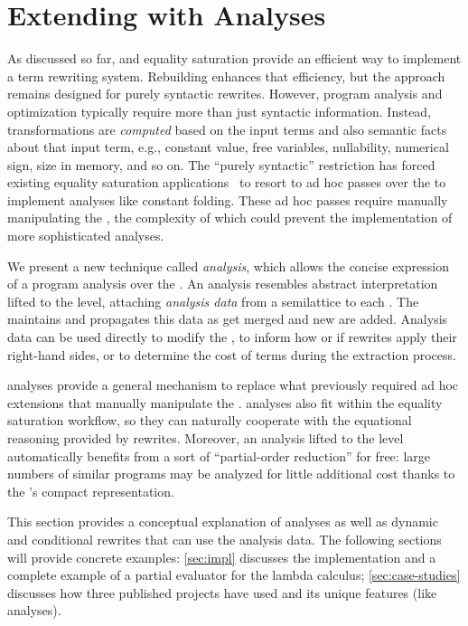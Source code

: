 \chapter{Extending \Egraphs with \Eclass Analyses}
\label{sec:extensions}

As discussed so far, \egraphs and equality saturation provide an efficient way
  to implement a term rewriting system.
Rebuilding enhances that efficiency, but the approach remains designed for
  purely syntactic rewrites.
However, program analysis and optimization typically require more than just
  syntactic information.
Instead, transformations are \emph{computed} based on the input terms and also semantic facts
  about that input term, e.g., constant value, free variables, nullability,
  numerical sign, size in memory, and so on.
The ``purely syntactic'' restriction has forced existing equality saturation
  applications~\cite{eqsat, eqsat-llvm, herbie} to
  resort to ad hoc passes over the \egraph
  to implement analyses like constant folding.
These ad hoc passes require manually manipulating the \egraph,
  the complexity of which could prevent the implementation of more sophisticated
  analyses.

We present a new technique called \textit{\eclass analysis},
  which allows the concise
  expression of a program analysis over the \egraph.
An \eclass analysis resembles abstract interpretation
  lifted to the \egraph level,
  attaching \textit{analysis data} from a semilattice to each \eclass.
The \egraph maintains and propagates this data as
  \eclasses get merged and new \enodes are added.
Analysis data can be used directly to modify the \egraph, to inform
  how or if rewrites apply their right-hand sides, or to determine the cost of
  terms during the extraction process.

\Eclass analyses provide a general mechanism to replace what previously
  required ad hoc extensions that manually manipulate the \egraph.
\Eclass analyses also fit within the equality saturation workflow,
  so they can naturally cooperate with the equational reasoning provided by
  rewrites.
Moreover, an analysis lifted to the \egraph level automatically benefits from a
  sort of ``partial-order reduction'' for free:
  large numbers of similar programs may be analyzed for little additional cost
  thanks to the \egraph's compact representation.

This section provides a conceptual explanation of \eclass analyses as well
  as dynamic and conditional rewrites that can use the analysis data.
The following sections will provide concrete examples:
  \autoref{sec:impl} discusses the \egg implementation and a complete example of a
  partial evaluator for the lambda calculus;
  \autoref{sec:case-studies} discusses how three published projects have used
  \egg and its unique features (like \eclass analyses).

